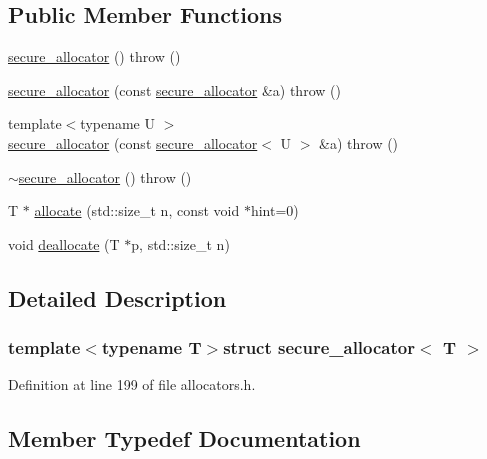 \subsection*{Public Member Functions}
\begin{DoxyCompactItemize}
\item 
\hyperlink{structsecure__allocator_ac5a927e4133d37b72aece43242903760}{secure\+\_\+allocator} ()  throw ()
\item 
\hyperlink{structsecure__allocator_ae5bfb3589a310e55894bae988d566c44}{secure\+\_\+allocator} (const \hyperlink{structsecure__allocator}{secure\+\_\+allocator} \&a)  throw ()
\item 
{\footnotesize template$<$typename U $>$ }\\\hyperlink{structsecure__allocator_ad7605317012ed2eed2eecb955345d140}{secure\+\_\+allocator} (const \hyperlink{structsecure__allocator}{secure\+\_\+allocator}$<$ U $>$ \&a)  throw ()
\item 
\hyperlink{structsecure__allocator_ac942adb3e90eff2b3b17be72a63c86a8}{$\sim$secure\+\_\+allocator} ()  throw ()
\item 
T $\ast$ \hyperlink{structsecure__allocator_aee6c375ead3ab5b477898787308bd2d9}{allocate} (std\+::size\+\_\+t n, const void $\ast$hint=0)
\item 
void \hyperlink{structsecure__allocator_af86cc49185bd507b8b479e070d744eb0}{deallocate} (T $\ast$p, std\+::size\+\_\+t n)
\end{DoxyCompactItemize}


\subsection{Detailed Description}
\subsubsection*{template$<$typename T$>$struct secure\+\_\+allocator$<$ T $>$}



Definition at line 199 of file allocators.\+h.



\subsection{Member Typedef Documentation}
\hypertarget{structsecure__allocator_aecbe486abe3e32e35e3289e149bd2356}{}
